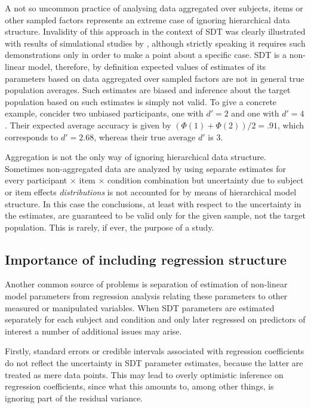 \documentclass[oneside,a4paper]{article}
\begin{document}
A not so uncommon practice of analysing data aggregated over subjects,
items or other sampled factors represents an extreme case of ignoring
hierarchical data structure. Invalidity of this approach in the
context of SDT was clearly illustrated with results of simulational
studies by , although strictly speaking it
requires such demonstrations only in order to make a point about a
specific case. SDT is a non-linear model, therefore, by definition
expected values of estimates of its parameters based on data
aggregated over sampled factors are not in general true population
averages. Such estimates are biased and inference about the target
population based on such estimates is simply not valid. To give a
concrete example, concider two unbiased participants, one with
$d' = 2$ and one with $d' = 4$. Their expected average accuracy is
given by $(\Phi(1) + \Phi(2)) / 2 = .91$, which corresponds to
$d' = 2.68$, whereas their true average $d'$ is $3$.

Aggregation is not the only way of ignoring hierarchical data
structure. Sometimes non-aggregated data are analyzed by using
separate estimates for every participant $\times$ item $\times$
condition combination but uncertainty due to subject or item effects
\emph{distributions} is not accounted for by means of hierarchical
model structure. In this case the conclusions, at least with respect
to the uncertainty in the estimates, are guaranteed to be valid only
for the given sample, not the target population. This is rarely, if
ever, the purpose of a study.

\subsection{Importance of including regression structure}

Another common source of problems is separation of estimation of
non-linear model parameters from regression analysis relating these
parameters to other measured or manipulated variables. When SDT
parameters are estimated separately for each subject and condition and
only later regressed on predictors of interest a number of additional
issues may arise.

Firstly, standard errors or credible intervals associated with
regression coefficients do not reflect the uncertainty in SDT
parameter estimates, because the latter are treated as mere data
points. This may lead to overly optimistic inference on regression
coefficients, since what this amounts to, among other things, is
ignoring part of the residual variance.
\end{document}
